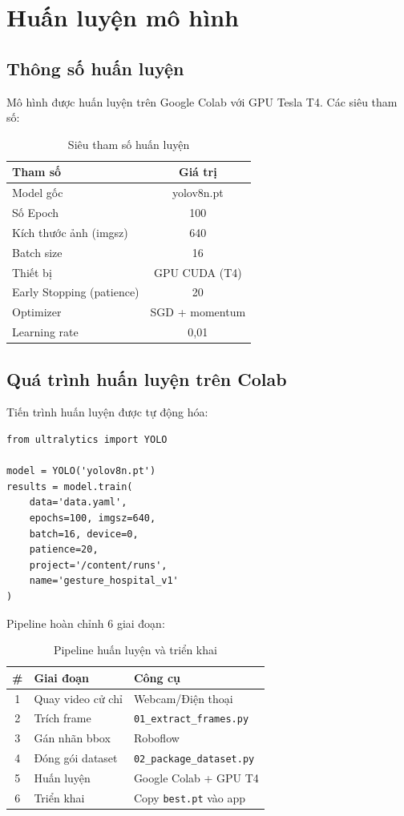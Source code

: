 \documentclass[conference]{IEEEtran}
\begin{document}
\section{Huấn luyện mô hình}

\subsection{Thông số huấn luyện}

Mô hình được huấn luyện trên Google Colab với GPU Tesla T4. Các siêu tham số:

\begin{table}[h]
\centering
\caption{Siêu tham số huấn luyện}
\label{tab:hyperparams}
\begin{tabular}{l|c}
\hline
\textbf{Tham số} & \textbf{Giá trị} \\
\hline
Model gốc & yolov8n.pt \\
Số Epoch & 100 \\
Kích thước ảnh (imgsz) & 640 \\
Batch size & 16 \\
Thiết bị & GPU CUDA (T4) \\
Early Stopping (patience) & 20 \\
Optimizer & SGD + momentum \\
Learning rate & 0,01 \\
\hline
\end{tabular}
\end{table}

\subsection{Quá trình huấn luyện trên Colab}

Tiến trình huấn luyện được tự động hóa:

\begin{lstlisting}[caption={Lệnh huấn luyện YOLOv8}]
from ultralytics import YOLO

model = YOLO('yolov8n.pt')
results = model.train(
    data='data.yaml',
    epochs=100, imgsz=640,
    batch=16, device=0,
    patience=20,
    project='/content/runs',
    name='gesture_hospital_v1'
)
\end{lstlisting}

Pipeline hoàn chỉnh 6 giai đoạn:

\begin{table}[h]
\centering
\caption{Pipeline huấn luyện và triển khai}
\label{tab:pipeline}
\begin{tabular}{c|l|l}
\hline
\textbf{\#} & \textbf{Giai đoạn} & \textbf{Công cụ} \\
\hline
1 & Quay video cử chỉ & Webcam/Điện thoại \\
2 & Trích frame & \texttt{01\_extract\_frames.py} \\
3 & Gán nhãn bbox & Roboflow \\
4 & Đóng gói dataset & \texttt{02\_package\_dataset.py} \\
5 & Huấn luyện & Google Colab + GPU T4 \\
6 & Triển khai & Copy \texttt{best.pt} vào app \\
\hline
\end{tabular}
\end{table}
\end{document}

